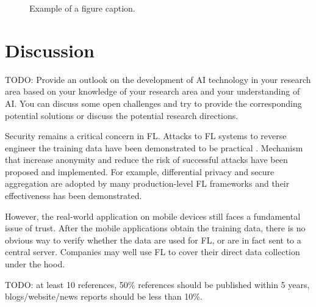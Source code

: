 \documentclass[conference]{IEEEtran}
\begin{document}
\begin{figure}[htbp]
\centerline{
}
\caption{Example of a figure caption.}
\label{fig}
\end{figure}

\section{Discussion}

TODO: Provide an outlook on the development of AI technology in
your research area based on your knowledge of your research area and
your understanding of AI.
You can discuss some open challenges and try to
provide the corresponding potential solutions or
discuss the potential research directions.

Security remains a critical concern in FL.
Attacks to FL systems to reverse engineer the training data have been
demonstrated to be practical \cite{sun2019really}.
Mechanism that increase anonymity and
reduce the risk of successful attacks have been proposed and implemented.
For example, differential privacy and secure aggregation are
adopted by many production-level FL frameworks and
their effectiveness has been demonstrated.

However, the real-world application on mobile devices still faces a fundamental
issue of trust.
After the mobile applications obtain the training data,
there is no obvious way to verify whether the data are used for FL,
or are in fact sent to a central server.
Companies may well use FL to cover their direct data collection under the hood.

\printbibliography

TODO: at least 10 references,
50\% references should be published within 5 years,
blogs/website/news reports should be less than 10\%.
\end{document}
